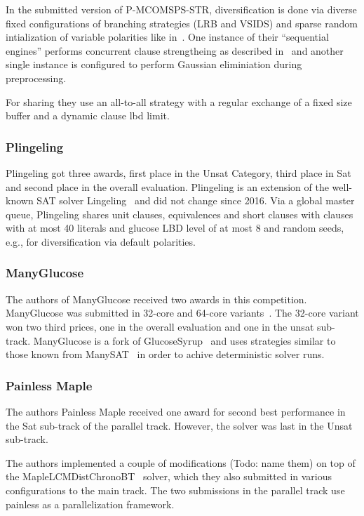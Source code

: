 \documentclass{elsarticle}
\newcommand{\todo}[1]{{\color{purple}Todo: #1}}
\begin{document}
In the submitted version of P-MCOMSPS-STR, diversification is done via diverse fixed configurations of branching strategies (LRB and VSIDS) and sparse random intialization of variable polarities like in~\cite{Balyo:2015:Hordesat}. 
One instance of their ``sequential engines'' performs concurrent clause strengtheing as described in~\cite{Wieringa:2013:CCS} and another single instance is configured to perform Gaussian eliminiation during preprocessing. 

For sharing they use an all-to-all strategy with a regular exchange of a fixed size buffer and a dynamic clause lbd limit. 


\subsubsection{Plingeling} 

Plingeling got three awards, first place in the Unsat Category, third place in Sat and second place in the overall evaluation. 
Plingeling is an extension of the well-known SAT solver Lingeling~\cite{} and did not change since 2016. 
Via a global master queue, Plingeling shares unit clauses, equivalences and short clauses with clauses with at most 40 literals and glucose LBD level of at most 8 and random seeds, e.g., for diversification via default polarities.~\cite{} 


\subsubsection{ManyGlucose}

The authors of ManyGlucose received two awards in this competition. 
ManyGlucose was submitted in 32-core and 64-core variants~\cite{}.
The 32-core variant won two third prices, one in the overall evaluation and one in the unsat sub-track. 
ManyGlucose is a fork of GlucoseSyrup~\cite{} and uses strategies similar to those known from ManySAT~\cite{} in order to achive deterministic solver runs. 


\subsubsection{Painless Maple} 

The authors Painless Maple received one award for second best performance in the Sat sub-track of the parallel track. 
However, the solver was last in the Unsat sub-track. 

The authors implemented a couple of modifications (\todo{name them}) on top of the MapleLCMDistChronoBT~\cite{} solver, which they also submitted in various configurations to the main track. 
The two submissions in the parallel track use painless as a parallelization framework. 
\end{document}
